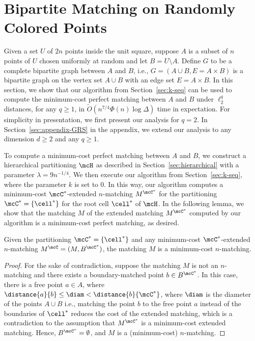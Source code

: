 \section{Bipartite Matching on Randomly Colored Points}\label{sec:randomly-colored}
Given a set $U$ of $2n$ points inside the unit square, suppose $A$ is a subset of $n$ points of $U$ chosen uniformly at random and let $B=U\setminus A$. Define $G$ to be a complete bipartite graph between $A$ and $B$, i.e., $G=(A\cup B, E=A\times B)$ is a bipartite graph on the vertex set $A\cup B$ with an edge set $E=A\times B$. In this section, we show that our algorithm from Section~\ref{sec:k-seq} can be used to compute the minimum-cost perfect matching between $A$ and $B$ under $\ell_2^q$ distances, for any $q\ge 1$, in $\tilde{O}(n^{7/4}\Phi(n)\log\Delta)$ time in expectation. For simplicity in presentation, we first present our analysis for $q=2$. In Section~\ref{sec:appendix-GRS} in the appendix, we extend our analysis to any dimension $d\ge 2$ and any $q\ge 1$. 




To compute a minimum-cost perfect matching between $A$ and $B$, we construct a hierarchical partitioning $\mcH$ as described in Section~\ref{sec:hierarchical} with a parameter $\lambda = 9n^{-1/4}$. We then execute our algorithm from Section~\ref{sec:k-seq}, where the parameter $k$ is set to $0$. In this way, our algorithm computes a minimum-cost $\mcC^*$-extended $n$-matching $M^{\mcC^*}$ for the partitioning $\mcC^*=\{\cell^*\}$ for the root cell $\cell^*$ of $\mcH$. In the following lemma, we show that the matching $M$ of the extended matching $M^{\mcC^*}$ computed by our algorithm is a minimum-cost perfect matching, as desired.

\begin{lemma}
    Given the partitioning $\mcC^*=\{\cell^*\}$ and any minimum-cost $\mcC^*$-extended $n$-matching $M^\mcC=(M, B^{\mcC^*})$, the matching $M$ is a minimum-cost $n$-matching.
\end{lemma}
\begin{proof}
    For the sake of contradiction, suppose the matching $M$ is not an $n$-matching and there exists a boundary-matched point $b\in B^{\mcC^*}$. In this case, there is a free point $a\in A$, where $\distance{a}{b}\le \diam <\distance{b}{\mcC^*}$, where $\diam$ is the diameter of the points $A\cup B$ i.e., matching the point $b$ to the free point $a$ instead of the boundaries of $\cell^*$ reduces the cost of the extended matching, which is a contradiction to the assumption that $M^{\mcC^*}$ is a minimum-cost extended matching. Hence, $B^{\mcC^*}=\emptyset$, and $M$ is a (minimum-cost) $n$-matching.
\end{proof}


